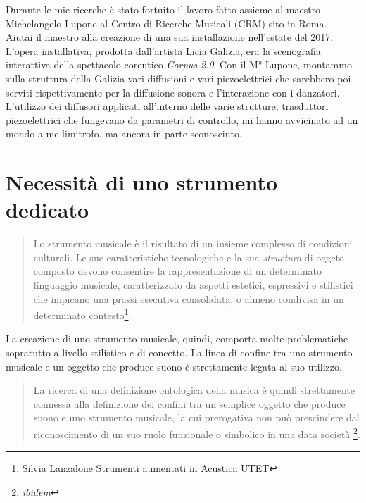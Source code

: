 Durante le mie ricerche è stato fortuito il lavoro fatto assieme al maestro Michelangelo Lupone al Centro di Ricerche Musicali (CRM) sito in Roma. \\
Aiutai il maestro alla creazione di una sua installazione nell'estate del 2017. L'opera installativa, prodotta dall'artista Licia Galizia, era la scenografia interattiva della spettacolo coreutico \textit{Corpus 2.0}. Con il M° Lupone, montammo sulla struttura della Galizia vari diffusioni e vari piezoelettrici che sarebbero poi serviti rispettivamente per la diffusione sonora e l'interazione con i danzatori. L'utilizzo dei diffusori applicati all'interno delle varie strutture, trasduttori piezoelettrici che fungevano da parametri di controllo, mi hanno avvicinato ad un mondo a me limitrofo, ma ancora in parte sconosciuto. \\

\section{Necessità di uno strumento dedicato}
\begin{small}
\begin{quotation}
Lo strumento musicale è il risultato di un insieme complesso di condizioni culturali.
Le sue caratteristiche tecnologiche e la sua \textit{structura} di oggeto composto devono consentire la rappresentazione di un determinato linguaggio musicale, caratterizzato da aspetti estetici, espressivi e stilistici che impicano una prassi esecutiva consolidata, o almeno condivisa in un determinato contesto\footnote{Silvia Lanzalone Strumenti aumentati in Acustica UTET}.
\end{quotation}
\end{small}
La creazione di uno strumento musicale, quindi, comporta molte problematiche sopratutto a livello stilistico e di concetto. La linea di confine tra uno strumento musicale e un oggetto che produce suono è strettamente legata al suo utilizzo. 
\begin{small}
\begin{quotation}
La ricerca di una definizione ontologica della musica è quindi strettamente connessa alla definizione dei confini tra un semplice oggetto che produce suono e uno strumento musicale, la cui prerogativa non può prescindere dal riconoscimento di un suo ruolo funzionale o simbolico in una data società
\footnote{\textit{ibidem}}.
\end{quotation}
\end{small}

